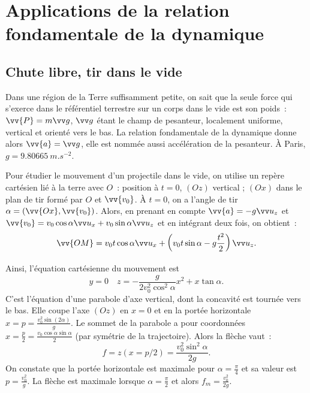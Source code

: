 \chapter{Applications de la relation fondamentale de la dynamique}%
\label{chap:applicationsdelarelationfondamentale}%
\minitoc{}%
\minilof{}%
\minilot{}%

\section{Chute libre, tir dans le vide}%
\label{sec-chap3:chutelibre}%

Dans une région de la Terre suffisamment petite, on sait que la seule force qui 
s'exerce dans le référentiel terrestre sur un corps dans le vide est son 
poids~: \(\vv{P}=m\vg\), \(\vg\) étant le champ de pesanteur, localement 
uniforme, vertical et orienté vers le bas. La relation fondamentale de la 
dynamique donne alors \(\vv{a}=\vg\), elle est nommée aussi accélération de la 
pesanteur. À Paris, \(g=\SI{9.80665}{m.s^{-2}}\).

Pour étudier le mouvement d'un projectile dans le vide, on utilise un repère 
cartésien lié à la terre avec \(O\)~: position à \(t=0\), \((Oz)\) vertical ; 
\((Ox)\) dans le plan de tir formé par \(O\) et \(\vv{v_0}\). À \(t=0\), on a 
l'angle de tir \(\alpha = (\vv{Ox}, \vv{v_0})\). Alors, en prenant en compte 
\(\vv{a} = -g\uz\) et \(\vv{v_0}= v_0\cos\alpha \ux + v_0\sin\alpha \uz\) et en 
intégrant deux fois, on obtient~:
\begin{equation}%
  \vv{OM} = v_0t\cos \alpha \ux + \left(v_0t\sin\alpha - g\frac{t^2}{2}\right) 
  \uz.
\end{equation}%

Ainsi, l'équation cartésienne du mouvement est
\begin{equation}%
  y=0 \quad z = -\frac{g}{2v_0^2\cos^2\alpha} x^2 + x\tan\alpha.
\end{equation}%
C'est l'équation d'une parabole d'axe vertical, dont la concavité est tournée 
vers le bas. Elle coupe l'axe \((Oz)\) en \(x=0\) et en la portée horizontale 
\(x=p=\frac{v_0^2\sin(2\alpha)}{g}\). Le sommet de la parabole a pour 
coordonnées \(x=\frac{p}{2}=\frac{v_0 \cos\alpha \sin\alpha}{2}\) (par symétrie 
de la trajectoire). Alors la flèche vaut~:
\begin{equation}%
  f=z(x=p/2) = \frac{v_0^2\sin^2\alpha}{2g}.
\end{equation}%
On constate que la portée horizontale est maximale pour 
\(\alpha=\frac{\pi}{4}\) et sa valeur est \(p=\frac{v_0^2}{g}\). La flèche est 
maximale lorsque \(\alpha=\frac{\pi}{2}\) et alors \(f_m = \frac{v_0^2}{2g}\).

